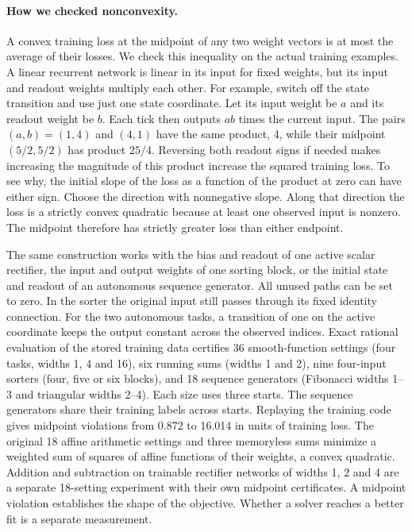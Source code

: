 \paragraph{How we checked nonconvexity.}
A convex training loss at the midpoint of any two weight vectors is at most the average of their losses. We check this inequality on the actual training examples. A linear recurrent network is linear in its input for fixed weights, but its input and readout weights multiply each other. For example, switch off the state transition and use just one state coordinate. Let its input weight be \(a\) and its readout weight be \(b\). Each tick then outputs \(ab\) times the current input. The pairs \((a,b)=(1,4)\) and \((4,1)\) have the same product, 4, while their midpoint \((5/2,5/2)\) has product \(25/4\). Reversing both readout signs if needed makes increasing the magnitude of this product increase the squared training loss. To see why, the initial slope of the loss as a function of the product at zero can have either sign. Choose the direction with nonnegative slope. Along that direction the loss is a strictly convex quadratic because at least one observed input is nonzero. The midpoint therefore has strictly greater loss than either endpoint.

The same construction works with the bias and readout of one active scalar rectifier, the input and output weights of one sorting block, or the initial state and readout of an autonomous sequence generator. All unused paths can be set to zero. In the sorter the original input still passes through its fixed identity connection. For the two autonomous tasks, a transition of one on the active coordinate keeps the output constant across the observed indices. Exact rational evaluation of the stored training data certifies 36 smooth-function settings (four tasks, widths 1, 4 and 16), six running sums (widths 1 and 2), nine four-input sorters (four, five or six blocks), and 18 sequence generators (Fibonacci widths 1--3 and triangular widths 2--4). Each size uses three starts. The sequence generators share their training labels across starts. Replaying the training code gives midpoint violations from 0.872 to 16.014 in units of training loss. The original 18 affine arithmetic settings and three memoryless sums minimize a weighted sum of squares of affine functions of their weights, a convex quadratic. Addition and subtraction on trainable rectifier networks of widths 1, 2 and 4 are a separate 18-setting experiment with their own midpoint certificates. A midpoint violation establishes the shape of the objective. Whether a solver reaches a better fit is a separate measurement.
